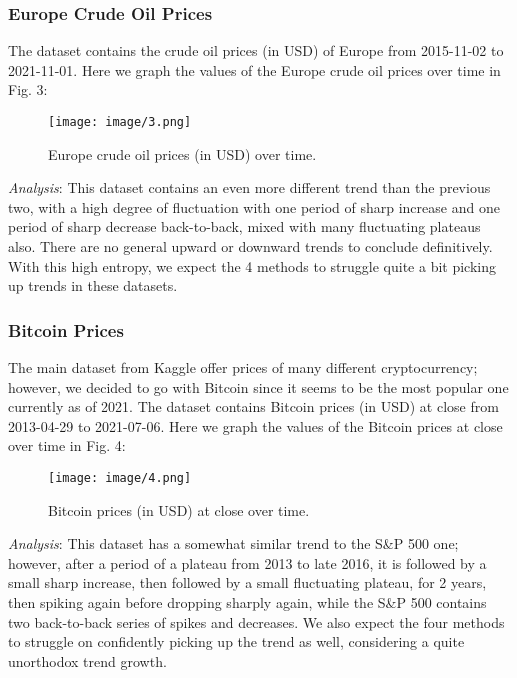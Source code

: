 \documentclass[letterpaper, 10 pt, conference]{ieeeconf}  %
\begin{document}
        \subsubsection{Europe Crude Oil Prices} The dataset contains the crude oil prices (in USD) of Europe from 2015-11-02 to 2021-11-01. Here we graph the values of the Europe crude oil prices over time in Fig. 3:

        \begin{figure}[thpb]
            \centering
             \texttt{[image: image/3.png]}
            \caption{Europe crude oil prices (in USD) over time.}
            \label{figurelabel}
        \end{figure}

        \textit{Analysis}: This dataset contains an even more different trend than the previous two, with a high degree of fluctuation with one period of sharp increase and one period of sharp decrease back-to-back, mixed with many fluctuating plateaus also. There are no general upward or downward trends to conclude definitively. With this high entropy, we expect the 4 methods to struggle quite a bit picking up trends in these datasets. 

        \subsubsection{Bitcoin Prices} The main dataset from Kaggle offer prices of many different cryptocurrency; however, we decided to go with Bitcoin since it seems to be the most popular one currently as of 2021. The dataset contains Bitcoin prices (in USD) at close from 2013-04-29 to 2021-07-06. Here we graph the values of the Bitcoin prices at close over time in Fig. 4:

        \begin{figure}[thpb]
            \centering
              \texttt{[image: image/4.png]}
            \caption{Bitcoin prices (in USD) at close over time.}
            \label{figurelabel}
        \end{figure}

        \textit{Analysis}: This dataset has a somewhat similar trend to the S\&P 500 one; however, after a period of a plateau from 2013 to late 2016, it is followed by a small sharp increase, then followed by a small fluctuating plateau, for 2 years, then spiking again before dropping sharply again, while the S\&P 500 contains two back-to-back series of spikes and decreases. We also expect the four methods to struggle on confidently picking up the trend as well, considering a quite unorthodox trend growth.
\end{document}
